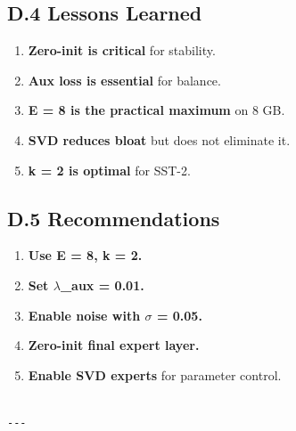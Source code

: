 \subsection{D.4 Lessons Learned}

\begin{enumerate}
\item \textbf{Zero-init is critical} for stability.
\item \textbf{Aux loss is essential} for balance.
\item \textbf{E = 8 is the practical maximum} on 8 GB.
\item \textbf{SVD reduces bloat} but does not eliminate it.
\item \textbf{k = 2 is optimal} for SST-2.

\end{enumerate}
\subsection{D.5 Recommendations}

\begin{enumerate}
\item \textbf{Use E = 8, k = 2.}
\item \textbf{Set $\lambda$\_aux = 0.01.}
\item \textbf{Enable noise with $\sigma$ = 0.05.}
\item \textbf{Zero-init final expert layer.}
\item \textbf{Enable SVD experts} for parameter control.
\end{enumerate}
\begin{lstlisting}

---
\end{lstlisting}